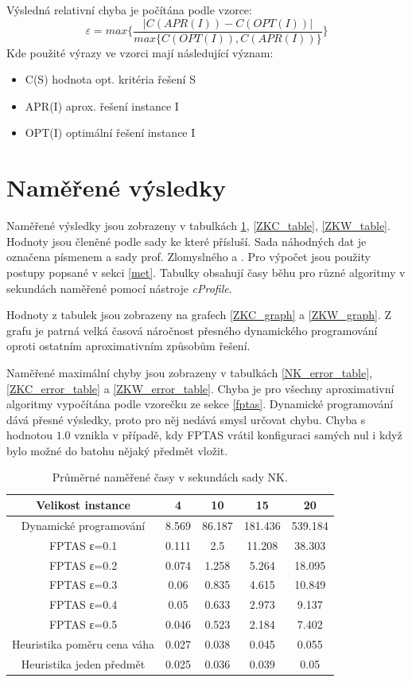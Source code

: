 \documentclass[12pt]{article}
\begin{document}
			Výsledná relativní chyba je počítána podle vzorce:
			\[ 
			\varepsilon = 
			max\{
			\dfrac{|C(APR(I)) - C(OPT(I))|}{max\{C(OPT(I)), C(APR(I))\}} 
			\} 
			\]
Kde použité výrazy ve vzorci mají následující význam:
\begin{itemize}
\item C(S) hodnota opt. kritéria řešení S 
\item APR(I) aprox. řešení instance I 
\item OPT(I) optimální řešení instance I 
\end{itemize}			
   		
   		
   	\section{Naměřené výsledky}
   		Naměřené výsledky jsou zobrazeny v tabulkách \ref{NK_table}, \ref{ZKC_table}, \ref{ZKW_table}. Hodnoty jsou členěné podle sady ke které přísluší. Sada náhodných dat je označena písmenem  a sady prof. Zlomyslného  a . Pro výpočet jsou použity postupy popsané v sekci \ref{met}. Tabulky obsahují časy běhu pro různé algoritmy v sekundách naměřené pomocí nástroje \textit{cProfile}.
   		
   		Hodnoty z tabulek jsou zobrazeny na grafech \ref{ZKC_graph} a \ref{ZKW_graph}. Z grafu je patrná velká časová náročnost přesného dynamického programování oproti ostatním aproximativním způsobům řešení.
   		
   		Naměřené maximální chyby jsou zobrazeny v tabulkách \ref{NK_error_table}, \ref{ZKC_error_table} a \ref{ZKW_error_table}. Chyba je pro všechny aproximativní algoritmy vypočítána podle vzorečku ze sekce \ref{fptas}. Dynamické programování dává přesné výsledky, proto pro něj nedává smysl určovat chybu. Chyba s hodnotou $1.0$ vznikla v případě, kdy FPTAS vrátil konfiguraci samých nul i když bylo možné do batohu nějaký předmět vložit.
   		
   		
\begin{table}[h!]
\centering
\begin{tabular}{ | c | | c | c | c | c | }\hline
Velikost instance & 4 & 10 & 15 & 20 \\ \hline \hline
Dynamické programování & 8.569 & 86.187 & 181.436 & 539.184  \\ \hline
FPTAS ε=0.1 & 0.111 & 2.5 & 11.208 & 38.303  \\ \hline
FPTAS ε=0.2 & 0.074 & 1.258 & 5.264 & 18.095  \\ \hline
FPTAS ε=0.3 & 0.06 & 0.835 & 4.615 & 10.849  \\ \hline
FPTAS ε=0.4 & 0.05 & 0.633 & 2.973 & 9.137  \\ \hline
FPTAS ε=0.5 & 0.046 & 0.523 & 2.184 & 7.402  \\ \hline
Heuristika poměru cena váha & 0.027 & 0.038 & 0.045 & 0.055  \\ \hline
Heuristika jeden předmět & 0.025 & 0.036 & 0.039 & 0.05  \\ \hline
\end{tabular}
\caption{Průměrné naměřené časy v sekundách sady NK.}
\label{NK_table}
\end{table}
\end{document}
